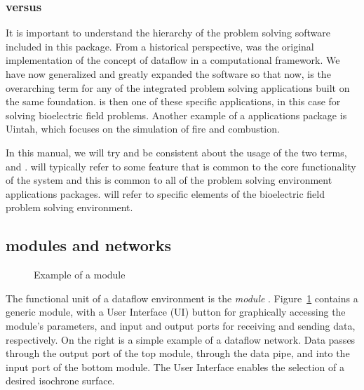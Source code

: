 \subsubsection{\SR{} versus \PSE{}}

It is important to understand the hierarchy of the problem solving software
included in this package.  From a historical perspective, \SR{} was the
original implementation of the concept of dataflow in a computational
framework\cite{CRJ:Joh94c,RSM:Par95,RSM:Par95b,RSM:Par97,RSM:Par97b,CRJ:Parker99b}.
We have now generalized and greatly expanded the \SR{} software so that
now, \SR{} is the overarching term for any of the integrated problem
solving applications built on the same foundation.  \PSE{} is then one of
these specific  applications, in this case for solving bioelectric field
problems.  Another example of a \SR{} applications package is
Uintah\cite{RSM:Dav2000}, which focuses on the simulation of fire and
combustion. 

In this manual, we will try and be consistent about the usage of the two
terms, \SR{} and \PSE{}.  \SR{} will typically refer to some feature that
is common to the core functionality of the system and this is common to all
of the problem solving environment applications packages.  \PSE{} will
refer to specific elements of the bioelectric field problem solving
environment.


\subsection{\SR{} modules and networks}
\label{sec:con-modules} 


\begin{figure}[htb]
  \begin{makeimage}
  \end{makeimage}
  \basicmodule
  \caption{\label{fig:conc-module} Example of a \SR{} module}
\end{figure}

The functional unit of a dataflow environment is the {\em\/module}
.  Figure~\ref{fig:conc-module} contains a generic \SR{}
module, with a User Interface (UI) button for graphically accessing the
module's parameters, and input and output ports for receiving and sending
data, respectively.  On the right is a simple example of a dataflow
network.  Data passes through the output port of the top module, through
the data pipe, and into the input port of the bottom module.  The User
Interface enables the selection of a desired isochrone surface.

